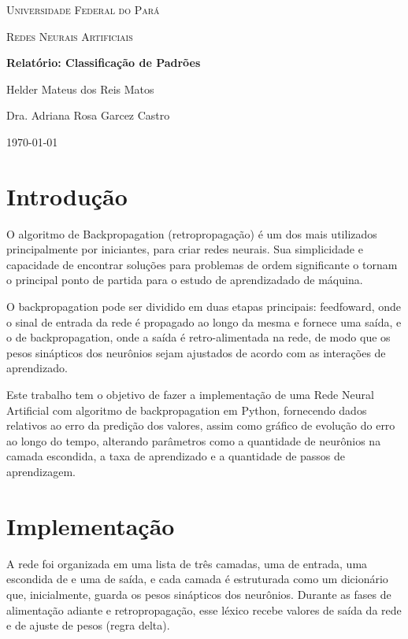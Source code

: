 \documentclass[12pt,a4paper]{article}
\begin{document}
\begin{titlepage}
	\centering
	{\scshape\LARGE Universidade Federal do Pará \par}
	\vspace{1cm}
	{\scshape\Large Redes Neurais Artificiais\par}
	\vspace{1.5cm}
	{\huge\bfseries Relatório: Classificação de Padrões\par}
	\vspace{2cm}
	{\Large Helder Mateus dos Reis Matos\par}
	\vfill
	Dra. Adriana Rosa Garcez Castro
	\vfill
	{\large \today\par}
\end{titlepage}

\tableofcontents
\newpage
\section{Introdução}
\qquad O algoritmo de Backpropagation (retropropagação) é um dos mais utilizados principalmente por iniciantes, para criar redes neurais. Sua simplicidade e capacidade de encontrar soluções para problemas de ordem significante o tornam o principal ponto de partida para o estudo de aprendizadado de máquina.
	
\qquad O backpropagation pode ser dividido em duas etapas principais: feedfoward, onde o sinal de entrada da rede é propagado ao longo da mesma e fornece uma saída, e o de backpropagation, onde a saída é retro-alimentada na rede, de modo que os pesos sinápticos dos neurônios sejam ajustados de acordo com as interações de aprendizado.
	
\qquad Este trabalho tem o objetivo de fazer a implementação de uma Rede Neural Artificial com algoritmo de backpropagation em Python, fornecendo dados relativos ao erro da predição dos valores, assim como gráfico de evolução do erro ao longo do tempo, alterando parâmetros como a quantidade de neurônios na camada escondida, a taxa de aprendizado e a quantidade de passos de aprendizagem.

\section{Implementação}
\qquad A rede foi organizada em uma lista de três camadas, uma de entrada, uma escondida de e uma de saída, e cada camada é estruturada como um dicionário que, inicialmente, guarda os pesos sinápticos dos neurônios. Durante as fases de alimentação adiante e retropropagação, esse léxico recebe valores de saída da rede e de ajuste de pesos (regra delta).
\end{document}
